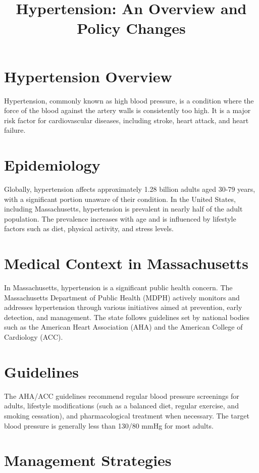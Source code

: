 \documentclass{article}
\title{Hypertension: An Overview and Policy Changes}
\author{}
\date{}
\begin{document}
\maketitle

\section{Hypertension Overview}
Hypertension, commonly known as high blood pressure, is a condition where the force of the blood against the artery walls is consistently too high. It is a major risk factor for cardiovascular diseases, including stroke, heart attack, and heart failure.

\section{Epidemiology}
Globally, hypertension affects approximately 1.28 billion adults aged 30-79 years, with a significant portion unaware of their condition. In the United States, including Massachusetts, hypertension is prevalent in nearly half of the adult population. The prevalence increases with age and is influenced by lifestyle factors such as diet, physical activity, and stress levels.

\section{Medical Context in Massachusetts}
In Massachusetts, hypertension is a significant public health concern. The Massachusetts Department of Public Health (MDPH) actively monitors and addresses hypertension through various initiatives aimed at prevention, early detection, and management. The state follows guidelines set by national bodies such as the American Heart Association (AHA) and the American College of Cardiology (ACC).

\section{Guidelines}
The AHA/ACC guidelines recommend regular blood pressure screenings for adults, lifestyle modifications (such as a balanced diet, regular exercise, and smoking cessation), and pharmacological treatment when necessary. The target blood pressure is generally less than 130/80 mmHg for most adults.

\section{Management Strategies}
\end{document}
